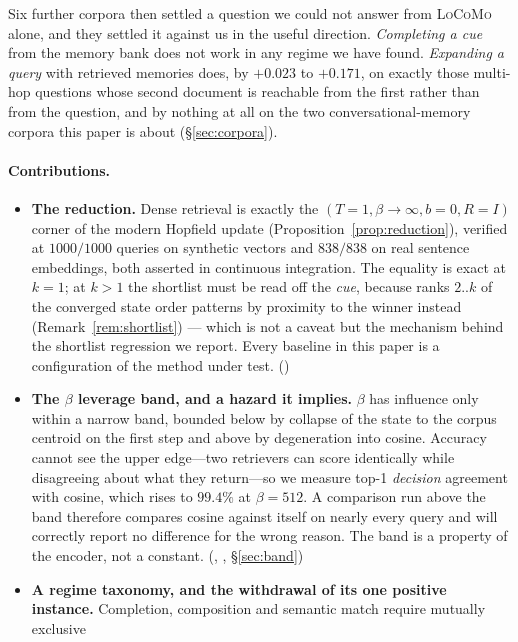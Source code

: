 Six further corpora then settled a question we could not answer from \textsc{LoCoMo} alone,
and they settled it against us in the useful direction. \emph{Completing a cue} from the
memory bank does not work in any regime we have found. \emph{Expanding a query} with
retrieved memories does, by $+0.023$ to $+0.171$, on exactly those multi-hop questions whose
second document is reachable from the first rather than from the question, and by nothing at
all on the two conversational-memory corpora this paper is about
(\S\ref{sec:corpora}).

\paragraph{Contributions.}
\begin{itemize}\itemsep2pt
  \item[\textbf{C1}] \textbf{The reduction.} Dense retrieval is exactly the
    $(T{=}1,\beta\!\to\!\infty,b{=}0,R{=}I)$ corner of the modern Hopfield update
    (Proposition~\ref{prop:reduction}), verified at $1000/1000$ queries on synthetic vectors
    and $838/838$ on real sentence embeddings, both asserted in continuous integration. The
    equality is exact at $k{=}1$; at $k>1$ the shortlist must be read off the \emph{cue},
    because ranks $2..k$ of the converged state order patterns by proximity to the winner
    instead (Remark~\ref{rem:shortlist}) --- which is not a caveat but the mechanism behind
    the shortlist regression we report. Every baseline in this paper is
    a configuration of the method under test. ()
  \item[\textbf{C2}] \textbf{The $\beta$ leverage band, and a hazard it implies.} $\beta$ has
    influence only within a narrow band, bounded below by collapse of the state to the corpus
    centroid on the first step and above by degeneration into cosine. Accuracy cannot see the
    upper edge---two retrievers can score identically while disagreeing about what they
    return---so we measure top-1 \emph{decision} agreement with cosine, which rises to
    $\mathbf{99.4\%}$ at $\beta{=}512$. A comparison run above the band therefore compares
    cosine against itself on nearly every query and will correctly report no difference for
    the wrong reason. The band is a property of the encoder, not a constant.
    (, , \S\ref{sec:band})
  \item[\textbf{C3}] \textbf{A regime taxonomy, and the withdrawal of its one positive
    instance.} Completion, composition and semantic match require mutually exclusive

\end{itemize}
